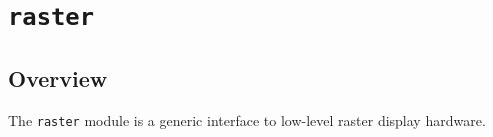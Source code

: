 %
% 
% 
\def\FileCreated{Mon Jan  8 03:04:45 2001}
\def\FileRevised{Mon Jan  8 03:58:39 2001}

\chapter{\tt raster}

\section{Overview}

The {\tt raster} module is a generic interface to low-level raster
display hardware.
